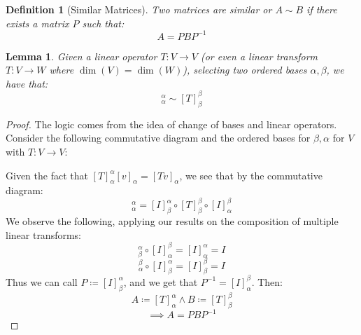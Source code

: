 \documentclass[10pt,letterpaper]{article} %
\newtheorem{lem}{Lemma}[section]
\newtheorem{defn}{Definition}[section]
\begin{document}
\begin{defn}[Similar Matrices]
Two matrices are similar or $A \sim B$ if there exists a matrix $P$ such that:
\begin{equation*}
A = PBP^{-1}
\end{equation*}
\end{defn}
\begin{lem}
Given a linear operator $T: V \xrightarrow{} V$ (or even a linear transform $T: V \xrightarrow{} W$ where $\dim(V) = \dim(W)$), selecting two ordered bases $\alpha, \beta$, we have that:
\begin{equation*}
[T]_{\alpha}^{\alpha} \sim [T]_\beta^\beta
\end{equation*}
\end{lem}
\begin{proof}
The logic comes from the idea of change of bases and linear operators. Consider the following commutative diagram and the ordered bases for $\beta, \alpha$ for $V$ with $T: V \xrightarrow{} V$:
\begin{center}
\end{center}
Given the fact that $[T]_{\alpha}^\alpha [v]_\alpha = [Tv]_\alpha$, we see that by the commutative diagram:
\begin{equation*}
[T]_{\alpha}^{\alpha} = [I]_{\beta}^\alpha \circ [T]_{\beta}^{\beta} \circ [I]_{\alpha}^{\beta}
\end{equation*}
We observe the following, applying our results on the composition of multiple linear transforms:
\begin{equation*}
[I]_{\beta}^\alpha \circ [I]_\alpha^\beta = [I]_\alpha^\alpha = I
\end{equation*}
\begin{equation*}
[I]_\alpha^\beta \circ [I]_\beta^\alpha = [I]_\beta^\beta = I
\end{equation*}
Thus we can call $P \coloneq [I]_\beta^\alpha$, and we get that $P^{-1} = [I]_\alpha^\beta$. Then:
\begin{equation*}
A \coloneq [T]_\alpha^\alpha \land B \coloneq [T]_\beta^\beta
\end{equation*}
\begin{equation*}
\implies A = PBP^{-1}
\end{equation*}
\end{proof}
 
\end{document}
